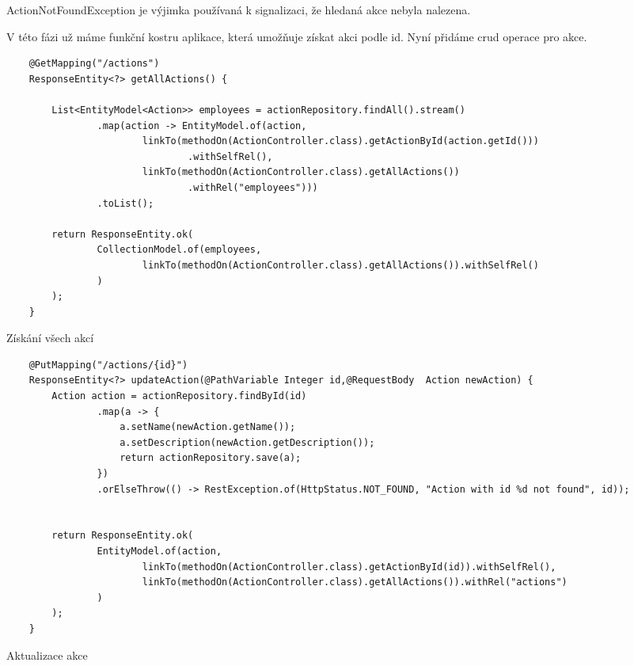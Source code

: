 ActionNotFoundException je výjimka používaná k signalizaci, že hledaná akce nebyla nalezena.

V této fázi už máme funkční kostru aplikace, která umožňuje získat akci podle id. Nyní přidáme crud operace pro akce.

\begin{listing}[H]
    \begin{verbatim}
    @GetMapping("/actions")
    ResponseEntity<?> getAllActions() {

        List<EntityModel<Action>> employees = actionRepository.findAll().stream()
                .map(action -> EntityModel.of(action,
                        linkTo(methodOn(ActionController.class).getActionById(action.getId()))
                                .withSelfRel(),
                        linkTo(methodOn(ActionController.class).getAllActions())
                                .withRel("employees")))
                .toList();

        return ResponseEntity.ok(
                CollectionModel.of(employees,
                        linkTo(methodOn(ActionController.class).getAllActions()).withSelfRel()
                )
        );
    }
    \end{verbatim}
    \caption{Získání všech akcí}
    \label{code:get-all-actions}
\end{listing}

\begin{listing}[H]
    \begin{verbatim}
    @PutMapping("/actions/{id}")
    ResponseEntity<?> updateAction(@PathVariable Integer id,@RequestBody  Action newAction) {
        Action action = actionRepository.findById(id)
                .map(a -> {
                    a.setName(newAction.getName());
                    a.setDescription(newAction.getDescription());
                    return actionRepository.save(a);
                })
                .orElseThrow(() -> RestException.of(HttpStatus.NOT_FOUND, "Action with id %d not found", id));


        return ResponseEntity.ok(
                EntityModel.of(action,
                        linkTo(methodOn(ActionController.class).getActionById(id)).withSelfRel(),
                        linkTo(methodOn(ActionController.class).getAllActions()).withRel("actions")
                )
        );
    }
    \end{verbatim}
    \caption{Aktualizace akce}
    \label{code:update-action}
\end{listing}


